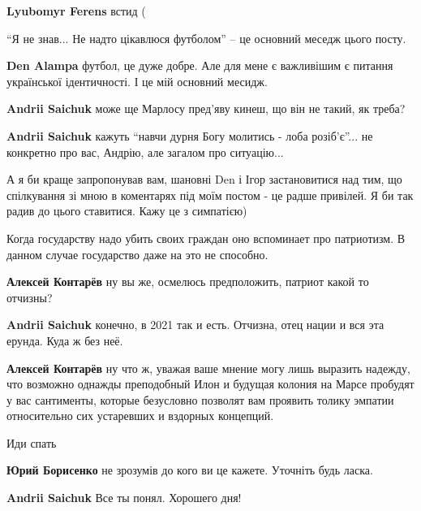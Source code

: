 \begin{itemize}
\textbf{Lyubomyr Ferens} встид (

\enquote{Я не знав... Не надто цікавлюся футболом} – це основний меседж цього посту.

\begin{itemize}

\textbf{Den Alampa} футбол, це дуже добре. Але для мене є важливішим є питання
української ідентичності. І це мій основний месидж.

\textbf{Andrii Saichuk} може ще Марлосу пред'яву кинеш, що він не такий, як треба?

\textbf{Andrii Saichuk} кажуть \enquote{навчи дурня Богу молитись - лоба розіб'є}... 
не конкретно про вас, Андрію, але загалом про ситуацію...

 А я би краще запропонував вам, шановні Den і Ігор
застановитися над тим, що спілкування зі мною в коментарях під моїм постом - це
радше привілей. Я би так радив до цього ставитися. Кажу це з симпатією)

\end{itemize}


Когда государству надо убить своих граждан оно вспоминает про патриотизм. В
данном случае государство даже на это не способно.

\begin{itemize}
\textbf{Алексей Контарёв} ну вы же, осмелюсь предположить, патриот какой то отчизны?

\textbf{Andrii Saichuk} конечно, в 2021 так и есть. Отчизна, отец нации и вся эта ерунда. Куда ж без неё.

\textbf{Алексей Контарёв} ну что ж, уважая ваше мнение могу лишь выразить
надежду, что возможно однажды преподобный Илон и будущая колония на Марсе
пробудят у вас сантименты, которые безусловно позволят вам проявить толику
эмпатии относительно сих устаревших и вздорных концепций.
\end{itemize}

Иди спать

\begin{itemize}
\textbf{Юрий Борисенко} не зрозумів до кого ви це кажете. Уточніть будь ласка.

\textbf{Andrii Saichuk} Все ты понял. Хорошего дня!


\end{itemize}
\end{itemize}
